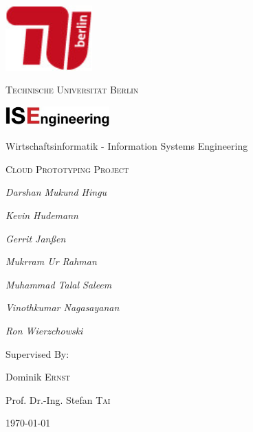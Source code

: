 \begin{titlepage}
	\centering
	\includegraphics[width=0.25\textwidth]{figures/tu_logo}\par\vspace{1cm}
	{\scshape\LARGE Technische Universität Berlin \par}
	\vspace{0.75cm}
	\includegraphics[width=0.3\textwidth]{figures/ise_logo}\par
    \vspace{0.25cm}
	{\normalsize Wirtschaftsinformatik - Information Systems Engineering \par}
    \vspace{0.5cm}
	{\scshape\Large Cloud Prototyping Project\par}
	\vspace{0.75cm}
	{\Large\itshape Darshan Mukund Hingu\par}
	{\Large\itshape Kevin Hudemann\par}
	{\Large\itshape Gerrit Janßen\par}
	{\Large\itshape Mukrram Ur Rahman\par}
	{\Large\itshape Muhammad Talal Saleem\par}
	{\Large\itshape Vinothkumar Nagasayanan\par}
	{\Large\itshape Ron Wierzchowski\par}
	\vfill
	Supervised By:\par
	Dominik \textsc{Ernst}\par
	Prof. Dr.-Ing. Stefan\textsc{ Tai}\par
	\vfill
	{\large \today\par}
\end{titlepage}

